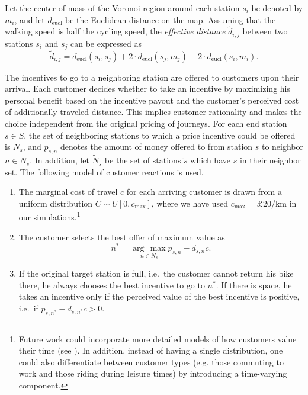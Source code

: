 \documentclass{article}
\begin{document}
Let the center of mass of the Voronoi region around each station $s_{i}$ be denoted
by $m_{i}$, and let $d_{\textrm{eucl}}$ be the Euclidean distance on the map.
Assuming that the walking speed is half the cycling speed, the \emph{effective
  distance} $\tilde d_{i,j}$ between two stations $s_{i}$ and $s_{j}$ can be
expressed as
\begin{equation}
  \label{eq:combined-distance}
  \tilde d_{i,j} = d_{\textrm{eucl}}(s_i,s_j)+2\cdot d_{\textrm{eucl}}(s_j,m_j)-2\cdot
  d_{\textrm{eucl}}(s_i,m_i).
\end{equation}

The incentives to go to a neighboring station are offered to customers upon
their arrival. Each customer decides whether to take an incentive by maximizing
his personal benefit based on the incentive payout and the customer's perceived
cost of additionally traveled distance. This implies customer rationality and
makes the choice independent from the original pricing of journeys. For each end
station $s\in S$, the set of neighboring stations to which a 
price incentive could be offered is $N_s$, and $p_{s,n}$ denotes the amount of money
offered to from station $s$ to neighbor $n\in N_s$. In addition, let $\tilde
N_s$ be the set of stations $\tilde s$ which have $s$ in their neighbor set. The
following model of customer reactions is used.
\begin{enumerate}
\item The marginal cost of travel $c$ for each arriving customer is drawn from a
  uniform distribution $C\sim U[0,c_{\max}]$, where we have used
  $c_{\max}=\pounds 20$/km in our simulations.\footnote{Future work could
    incorporate more detailed models of how customers value
    their time (see \cite{mackie2001value, hess2005estimation}). In addition, instead
    of having a single distribution, one could also differentiate between
    customer types (e.g. those commuting to work and those riding during leisure
    times) by introducing a time-varying component.}
\item The customer selects the best offer of maximum value as
  \begin{equation}
    \label{eq:bestvalue}
    n^* = \underset{n\in N_s}{\arg\,\max} p_{s,n}-d_{s,n}c.
\end{equation}
\item If the original target station is full, i.e.\ the customer cannot return
  his bike there, he always chooses the best incentive to go to $n^*$. If there
  is space, he takes an incentive only if the perceived value of the best
  incentive is positive, i.e.\ if $p_{s,n^*} - d_{s,n^*}c > 0$.
\end{enumerate}
\end{document}
